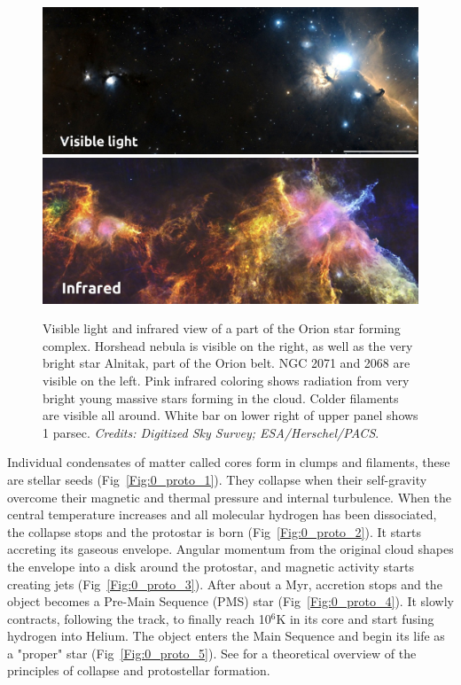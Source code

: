 \begin{figure}
\center
\includegraphics[width=0.95\linewidth]{Figures/0_horsehead_visible2}
\includegraphics[width=0.95\linewidth]{Figures/0_horsehead_infrared}
\caption[Visible light  and infrared view of a part of the Orion star forming complex]{Visible light  and infrared view of a part of the Orion star forming complex. Horshead nebula is visible on the right, as well as the very bright star Alnitak, part of the Orion belt. NGC 2071 and 2068 are visible on the left. Pink infrared coloring shows radiation from very bright young massive stars forming in the cloud. Colder filaments are visible all around. White bar on lower right of upper panel shows 1 parsec. \textit{Credits: Digitized Sky Survey; ESA/Herschel/PACS}. }
\label{Fig:0_horsehead}
\end{figure}

Individual condensates of matter called cores form in clumps and filaments, these are stellar seeds (Fig~\ref{Fig:0_proto_1}). They collapse when their self-gravity overcome their magnetic and thermal pressure and internal turbulence. When the central temperature increases and all molecular hydrogen has been dissociated, the collapse stops and the protostar is born (Fig~\ref{Fig:0_proto_2}). It starts accreting its gaseous envelope. Angular momentum from the original cloud shapes the envelope into a disk around the protostar, and magnetic activity starts creating jets (Fig~\ref{Fig:0_proto_3}). After about a Myr, accretion stops and the object becomes a Pre-Main Sequence (PMS) star (Fig~\ref{Fig:0_proto_4}). It slowly contracts, following the \cite{Hayashi1961} track, to finally reach 10$^6$K in its core and start fusing hydrogen into Helium. The  object enters the Main Sequence and begin its life as a "proper" star (Fig~\ref{Fig:0_proto_5}). See \cite{Larson1969} for a theoretical overview of the principles of collapse and protostellar formation. 

